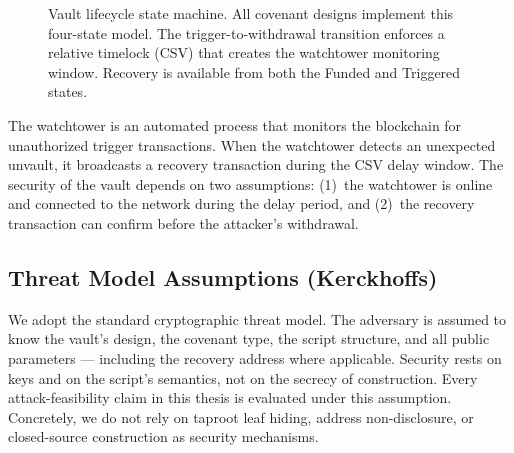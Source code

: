 \begin{figure}[t]
\centering
{}
\caption{Vault lifecycle state machine. All covenant designs implement this four-state
model. The trigger-to-withdrawal transition enforces a relative timelock (CSV) that
creates the watchtower monitoring window. Recovery is available from both the Funded
and Triggered states.}
\label{fig:vault_lifecycle}
\end{figure}

The watchtower is an automated process that monitors the blockchain for unauthorized
trigger transactions. When the watchtower detects an unexpected unvault, it broadcasts
a recovery transaction during the CSV delay window. The security of the vault depends
on two assumptions: (1)~the watchtower is online and connected to the network during
the delay period, and (2)~the recovery transaction can confirm before the attacker's
withdrawal.

\subsection{Threat Model Assumptions (Kerckhoffs)}
\label{ss:kerckhoffs}

We adopt the standard cryptographic threat model. The adversary is
assumed to know the vault's design, the covenant type, the script
structure, and all public parameters --- including the recovery
address where applicable. Security rests on keys and on the script's
semantics, not on the secrecy of construction. Every attack-feasibility
claim in this thesis is evaluated under this assumption. Concretely,
we do not rely on taproot leaf hiding, address non-disclosure, or
closed-source construction as security mechanisms.

